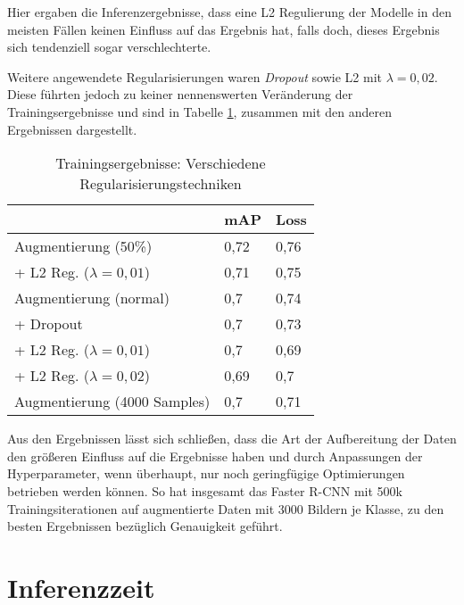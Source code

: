 Hier ergaben die Inferenzergebnisse, dass 
eine L2 Regulierung der Modelle
in den meisten Fällen keinen Einfluss auf das Ergebnis
hat, falls doch, dieses Ergebnis sich tendenziell sogar
verschlechterte.

Weitere angewendete Regularisierungen
waren \textit{Dropout} sowie L2 mit $\lambda = 0,02$.
Diese führten jedoch zu keiner nennenswerten Veränderung der
 Trainingsergebnisse und sind in Tabelle \ref{table:reg},
  zusammen mit den anderen Ergebnissen
 dargestellt.

\vspace{1cm}

\begin{table}[htb]
  \centering
  \begin{tabular}{m{}|m{}<{\centering}m{}<{\centering}}
  \hline
                    & mAP  & Loss  \\ \hline\hline
  Augmentierung (50\%) &  0,72    &    0,76   \\
   + L2 Reg. ($\lambda = 0,01$)            &   0,71     & 0,75       \\\hline
  Augmentierung (normal)     & 0,7  & 0,74            \\
  + Dropout          & 0,7  & 0,73            \\
  + L2 Reg. ($\lambda = 0,01$)    & 0,7  & 0,69            \\
  + L2 Reg. ($\lambda = 0,02$)    & 0,69 & 0,7             \\ \hline
  Augmentierung (4000 Samples) &0,7&0,71\\\hline
  \end{tabular}
  \caption{Trainingsergebnisse: Verschiedene Regularisierungstechniken}
  \label{table:reg}
\end{table}
\vspace{1cm}

Aus den Ergebnissen lässt sich schließen, dass die Art
der Aufbereitung der Daten den größeren Einfluss auf die Ergebnisse
haben und durch Anpassungen der Hyperparameter, wenn überhaupt,
nur noch geringfügige Optimierungen betrieben werden können.
So hat insgesamt das Faster R-CNN mit 500k Trainingsiterationen 
auf augmentierte Daten mit 3000 Bildern je Klasse, zu
den besten Ergebnissen bezüglich Genauigkeit geführt.


\section{Inferenzzeit}\label{sec:infertime}

